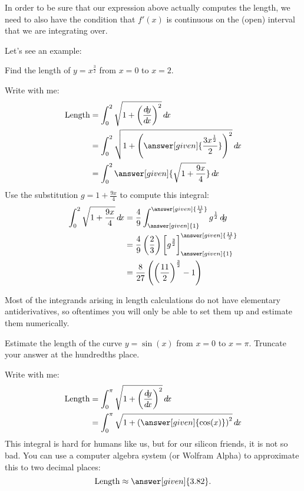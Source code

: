\documentclass{ximera}
\begin{document}
\begin{warning}
  In order to be sure that our expression above actually computes the
  length, we need to also have the condition that $f'(x)$ is
  continuous on the (open) interval that we are integrating over.
\end{warning}

Let's see an example:
\begin{example}%
  Find the length of $y = x^{\frac{3}{2}}$ from $x=0$ to $x=2$.
  \begin{explanation}
    Write with me:
    \begin{align*}
      \text{Length} &= \int_0^2 \sqrt{1+\left( \frac{\d y}{ \d x}\right)^2} \d x\\
      &= \int_0^2 \sqrt{1+\left(
        \answer[given]{\frac{3 x^{\frac{1}{2}}}{2}}\right)^2} \d x\\
      &= \int_0^2 \answer[given]{\sqrt{1+\frac{9x}{4}}} \d x
    \end{align*}
      Use the substitution $g = 1+\frac{9x}{4}$ to compute this integral:
      \begin{align*}
	\int_0^2 \sqrt{1+\frac{9x}{4}} \d x &= \frac{4}{9} \int_{\answer[given]{1}}^{\answer[given]{\frac{11}{2}}} g^\frac{1}{2} \d g\\
	&= \frac{4}{9} \left(\frac{2}{3}\right) \eval{g^{\frac{3}{2}}}_{\answer[given]{1}}^{\answer[given]{\frac{11}{2}}}\\
	&=\frac{8}{27} \left(\left(\frac{11}{2}\right)^\frac{3}{2} - 1\right)
      \end{align*}
  \end{explanation}
\end{example}

Most of the integrands arising in length calculations do not have
elementary antiderivatives, so oftentimes you will only be able to set
them up and estimate them numerically.

\begin{example}
  Estimate the length of the curve $y = \sin(x)$ from $x=0$ to $x =
  \pi$.  Truncate your answer at the hundredths place.
  \begin{explanation}
    Write with me:
    \begin{align*}
      \text{Length} &= \int_0^\pi \sqrt{1+\left( \frac{\d y}{ \d x}\right)^2} \d x\\
      &= \int_0^\pi \sqrt{1+\left(
        \answer[given]{\cos(x)}\right)^2} \d x
    \end{align*}
    This integral is hard for humans like us, but for our silicon
    friends, it is not so bad.  You can use a computer algebra system
    (or Wolfram Alpha) to approximate this to two decimal places:
    \[
    \text{Length} \approx \answer[given]{3.82}.
    \]
  \end{explanation}
\end{example}
\end{document}
